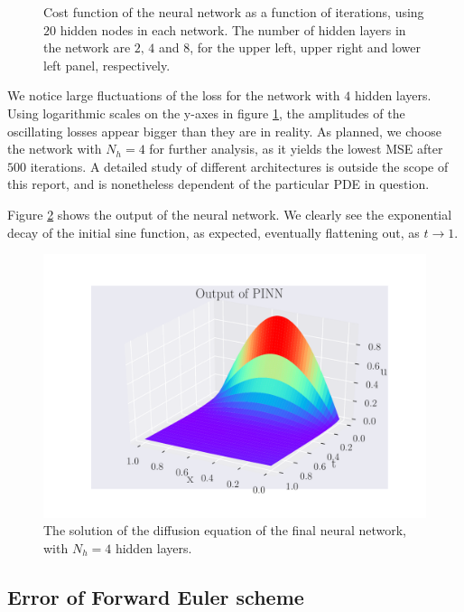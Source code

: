 \documentclass[12pt]{extarticle}
\begin{document}
\begin{figure}[h]
	\endminipage\hfill
	\caption{Cost function of the neural network as a function of iterations, using $20$ hidden nodes in each network. The number of hidden layers in the network are $2,\,4$ and $8$, for the upper left, upper right and lower left panel, respectively.} \label{fig:Error_NN_architecture}
	\endminipage
\end{figure}

We notice large fluctuations of the loss for the network with $4$ hidden layers. Using logarithmic scales on the y-axes in figure \ref{fig:Error_NN_architecture}, the amplitudes of the oscillating losses appear bigger than they are in reality. As planned, we choose the network with $N_h=4$ for further analysis, as it yields the lowest MSE after $500$ iterations. A detailed study of different architectures is outside the scope of this report, and is nonetheless dependent of the particular PDE in question. 


Figure \ref{fig:NN_architecture_solution} shows the output of the neural network. We clearly see the exponential decay of the initial sine function, as expected, eventually flattening out, as $t\to1$.   
\begin{figure}[h]
	\centering
	\includegraphics[width=\linewidth]{../output/plots/NN_diffusion_solution_Nn20_Nh4.pdf}
	\caption{The solution of the diffusion equation of the final neural network, with $N_h=4$ hidden layers.} \label{fig:NN_architecture_solution}
\end{figure}


\subsection{Error of Forward Euler scheme}
\end{document}
